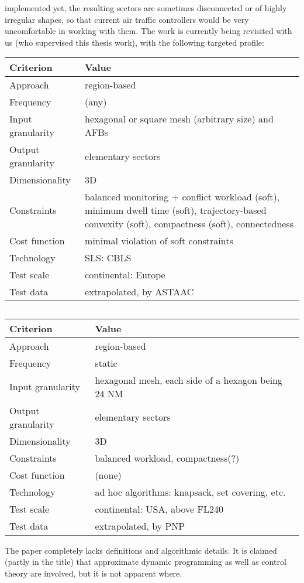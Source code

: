 \documentclass[a4paper,12pt]{article}
\begin{document}
implemented yet, the resulting sectors are sometimes disconnected or
of highly irregular shapes, so that current air traffic controllers
would be very uncomfortable in working with them.
The work is currently being revisited with us (who supervised this
thesis work), with the following targeted profile:
\begin{center}
\begin{tabular}{|l|l|}
  \hline
  Criterion & Value \\
  \hline\hline
  Approach & region-based \\ \hline
  Frequency & (any) \\ \hline
  Input granularity & hexagonal or square mesh (arbitrary size) and AFBs \\ \hline
  Output granularity & elementary sectors \\ \hline
  Dimensionality & 3D \\ \hline
  Constraints & \parbox{11.5cm}{balanced monitoring + conflict
    workload (soft), minimum dwell time (soft), trajectory-based
    convexity (soft), compactness (soft), connectedness} \\ \hline
  Cost function & minimal violation of soft constraints \\ \hline
  Technology & SLS: CBLS \\ \hline
  Test scale & continental: Europe \\ \hline
  Test data & extrapolated, by ASTAAC \\ \hline
\end{tabular}
\end{center}

\subsection{\cite{Kulkarni:ICNS11}}

\begin{center}
\begin{tabular}{|l|l|}
  \hline
  Criterion & Value \\
  \hline\hline
  Approach & region-based \\ \hline
  Frequency & static \\ \hline
  Input granularity & hexagonal mesh, each side of a hexagon being $24$ NM \\ \hline
  Output granularity & elementary sectors \\ \hline
  Dimensionality & 3D \\ \hline
  Constraints & balanced workload, compactness(?) \\ \hline
  Cost function & (none) \\ \hline
  Technology & ad hoc algorithms: knapsack, set covering, etc. \\ \hline
  Test scale & continental: USA, above FL240 \\ \hline
  Test data & extrapolated, by PNP \\ \hline
\end{tabular}
\end{center}
The paper completely lacks definitions and algorithmic details.  It is
claimed (partly in the title) that approximate dynamic programming as
well as control theory are involved, but it is not apparent where.
\end{document}
